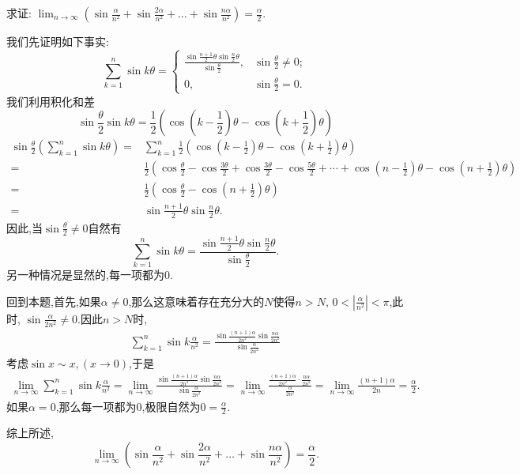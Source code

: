 \begin{exercise}[1.3.7]
    求证: $\lim_{n \to \infty} \left(\sin\frac{\alpha}{n^2} + \sin\frac{2\alpha}{n^2} + \dots + \sin\frac{n\alpha}{n^2}\right) = \frac{\alpha}{2}$.
\end{exercise}

\begin{solution}
    我们先证明如下事实:
    $$
        \sum_{k=1}^n \sin k \theta =\begin{cases}
            \frac{\sin\frac{n+1}{2}\theta\sin\frac{n}{2}\theta}{\sin \frac{\theta}{2}}, & \sin \frac{\theta}{2} \ne 0; \\
            0, & \sin \frac{\theta}{2} = 0.
        \end{cases}
    $$
    我们利用积化和差$$\sin \frac{\theta}{2}\sin k\theta = \frac{1}{2}\left(\cos\left(k-\frac{1}{2}\right)\theta-\cos\left(k+\frac{1}{2}\right)\theta\right)$$
    \begin{align*}
        \sin \frac{\theta}{2}\left(\sum_{k=1}^n \sin k \theta \right)=&\sum_{k=1}^n \frac{1}{2}\left(\cos\left(k-\frac{1}{2}\right)\theta-\cos\left(k+\frac{1}{2}\right)\theta\right) \\
        =&\frac{1}{2}\left(\cos \frac{\theta}{2} -\cos \frac{3\theta}{2}+\cos \frac{3\theta}{2} -\cos \frac{5\theta}{2}+\cdots+ \cos\left(n-\frac{1}{2}\right)\theta-\cos\left(n+\frac{1}{2}\right)\theta\right) \\
        =&\frac{1}{2}\left(\cos \frac{\theta}{2} -\cos\left(n+\frac{1}{2}\right)\theta\right) \\
        =&\sin\frac{n+1}{2}\theta\sin\frac{n}{2}\theta.
    \end{align*}
    因此,当$ \sin \frac{\theta}{2}\neq 0$自然有$$
        \sum_{k=1}^n \sin k \theta =
            \frac{\sin\frac{n+1}{2}\theta\sin\frac{n}{2}\theta}{\sin \frac{\theta}{2}}.
    $$
    另一种情况是显然的,每一项都为$0$.
        
    回到本题,首先,如果$\alpha\neq 0$,那么这意味着存在充分大的$N$使得$n>N$, $0<\left|\frac{\alpha}{n^2}\right|<\pi$,此时, $\sin \frac{\alpha}{2n^2} \neq 0$.因此$n>N$时,
    \begin{align*}
        \sum_{k=1}^n \sin k \frac{\alpha}{n^2} =  \frac{\sin\frac{(n+1)\alpha}{2n^2}\sin\frac{n\alpha}{2n^2}}{\sin \frac{\alpha}{2n^2}}
    \end{align*}
    考虑$\sin x \sim x , (x \to 0)$,于是
    \begin{align*}
        \lim_{n\to\infty}\sum_{k=1}^n \sin k \frac{\alpha}{n^2} 
        =\lim_{n \to \infty} \frac{\sin\frac{(n+1)\alpha}{2n^2}\sin\frac{n\alpha}{2n^2}}{\sin \frac{\alpha}{2n^2}}
        =\lim_{n \to \infty} \frac{\frac{(n+1)\alpha}{2n^2}
        \cdot\frac{n\alpha}{2n^2}}{\frac{\alpha}{2n^2}}  =\lim_{n \to \infty} \frac{(n+1)\alpha}{2n}  = \frac{\alpha}{2}.
    \end{align*}
    如果$\alpha = 0$,那么每一项都为$0$,极限自然为$0=\frac{\alpha}{2}$.
    
    综上所述, $$\lim_{n \to \infty} \left(\sin\frac{\alpha}{n^2} + \sin\frac{2\alpha}{n^2} + \dots + \sin\frac{n\alpha}{n^2}\right) = \frac{\alpha}{2}.$$

\end{solution}

